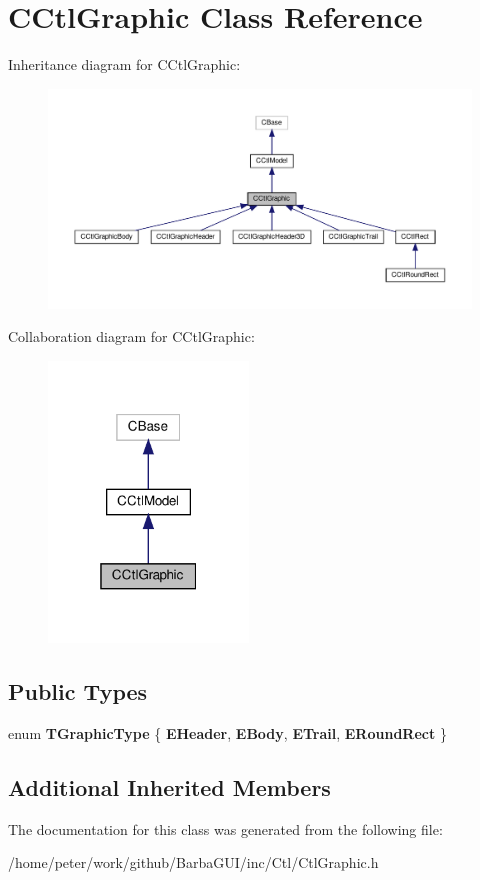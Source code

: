 \hypertarget{classCCtlGraphic}{}\section{C\+Ctl\+Graphic Class Reference}
\label{classCCtlGraphic}


Inheritance diagram for C\+Ctl\+Graphic\+:
\nopagebreak
\begin{figure}[H]
\begin{center}
\leavevmode
\includegraphics[width=350pt]{classCCtlGraphic__inherit__graph}
\end{center}
\end{figure}


Collaboration diagram for C\+Ctl\+Graphic\+:
\nopagebreak
\begin{figure}[H]
\begin{center}
\leavevmode
\includegraphics[width=151pt]{classCCtlGraphic__coll__graph}
\end{center}
\end{figure}
\subsection*{Public Types}
\begin{DoxyCompactItemize}
\item 
\mbox{\label{classCCtlGraphic_aef9f8dddf738a51d4493f06236210146}} 
enum {\bfseries T\+Graphic\+Type} \{ {\bfseries E\+Header}, 
{\bfseries E\+Body}, 
{\bfseries E\+Trail}, 
{\bfseries E\+Round\+Rect}
 \}
\end{DoxyCompactItemize}
\subsection*{Additional Inherited Members}


The documentation for this class was generated from the following file\+:\begin{DoxyCompactItemize}
\item 
/home/peter/work/github/\+Barba\+G\+U\+I/inc/\+Ctl/Ctl\+Graphic.\+h\end{DoxyCompactItemize}
